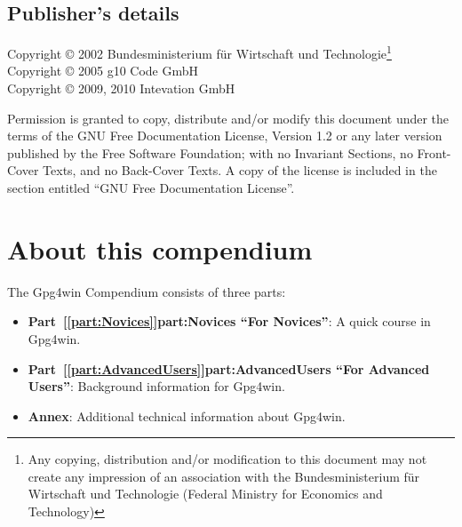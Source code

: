 \documentclass[a4paper,11pt,oneside,openright,titlepage]{scrbook}
\title{
    \IncludeImage[width=0.5\textwidth]{gpg4win-logo}%
    \T~\newline
    \ifthenelse{\boolean{DIN-A5}}%
    {
        \LARGE The Gpg4win Compendium\\[0.3cm]
        \large \textmd{Secure e-mail and file encryption
        \\[-0.3cm] using GnuPG for Windows}
    }%
    {The Gpg4win Compendium \\
      {\Large \textmd}
      {Secure e-mail and file encryption using GnuPG for
      Windows}
    }
}
\author{
    \\[-1cm]
      \small Based on a version by
    \\[-0.2cm]
      \small Ute Bahn, Karl Bihlmeier, Manfred J. Heinze,
      \small Isabel Kramer und Dr. Francis Wray.
      {\\[0.2cm]}
      \small Extensively revised by
    \\[-0.2cm]
      \small Werner Koch, Florian v. Samson, Emanuel Schütze and Dr. Jan-Oliver Wagner.
      \\[0.2cm]}
\date{
    \ifthenelse{\boolean{DIN-A5}}%
    {
        \large A publication of the Gpg4win Initiative
        \\[0.2cm]
        Version \compendiumVersionEN~from \compendiumDateEN

    }%
    {A publication of the Gpg4win Initiative
      \\[0.2cm]
      Version \compendiumVersionEN~from \compendiumDateEN\\
    }
}
\begin{document}
    {\noindent\hspace*{7mm}\parbox{\textwidth}{\centering\maketitle}\cleardoublepage}
    {\maketitle}




\setlength\emergencystretch{3em} 


\section*{Publisher's details}


\thispagestyle{empty}
Copyright \copyright{} 2002 Bundesministerium für Wirtschaft und
Technologie\footnote{Any copying, distribution and/or modification to
this document may not create any impression of an association with the
Bundesministerium für Wirtschaft und Technologie
(Federal Ministry for
Economics and Technology)}\\
Copyright \copyright{} 2005 g10 Code GmbH\\
Copyright \copyright{} 2009, 2010 Intevation GmbH

Permission is granted to copy, distribute and/or modify this document
under the terms of the GNU Free Documentation License, Version 1.2 or
any later version published by the Free Software Foundation; with no
Invariant Sections, no Front-Cover Texts, and no Back-Cover Texts. A
copy of the license is included in the section entitled ``GNU Free
Documentation License''.



\clearpage
\chapter*{About this compendium}

The Gpg4win Compendium consists of three parts:

\begin{itemize}
\item \textbf{Part~[\ref{part:Novices}]{part:Novices}
    ``For Novices''}: A quick course in Gpg4win.

\item \textbf{Part~[\ref{part:AdvancedUsers}]{part:AdvancedUsers}
    ``For Advanced Users''}: Background information for Gpg4win.

\item \textbf{Annex}: Additional technical information about Gpg4win.\\
\end{itemize}
\end{document}
